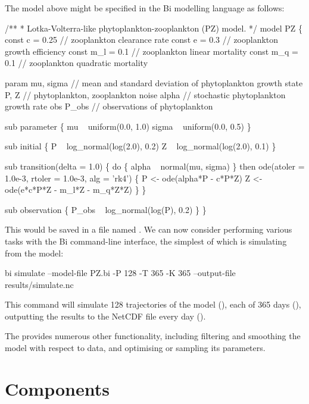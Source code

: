 The model above might be specified in the Bi modelling language as follows:
\begin{bicode}
/**
 * Lotka-Volterra-like phytoplankton-zooplankton (PZ) model.
 */
model PZ \{
  const c = 0.25   // zooplankton clearance rate
  const e = 0.3    // zooplankton growth efficiency
  const m_l = 0.1  // zooplankton linear mortality
  const m_q = 0.1  // zooplankton quadratic mortality

  param mu, sigma  // mean and standard deviation of phytoplankton growth
  state P, Z       // phytoplankton, zooplankton
  noise alpha      // stochastic phytoplankton growth rate
  obs P_obs        // observations of phytoplankton
  
  sub parameter \{
    mu ~ uniform(0.0, 1.0)
    sigma ~ uniform(0.0, 0.5)
  \}
  
  sub initial \{
    P ~ log_normal(log(2.0), 0.2)
    Z ~ log_normal(log(2.0), 0.1)
  \}

  sub transition(delta = 1.0) \{
    do \{
      alpha ~ normal(mu, sigma)
    \} then ode(atoler = 1.0e-3, rtoler = 1.0e-3, alg = 'rk4') \{
      P <- ode(alpha*P - c*P*Z)
      Z <- ode(e*c*P*Z - m_l*Z - m_q*Z*Z)
    \}
  \}

  sub observation \{
    P_obs ~ log_normal(log(P), 0.2)
  \}
\}
\end{bicode}

This would be saved in a file named . We can now consider
performing various tasks with the Bi command-line interface, the simplest of
which is simulating from the model:
\begin{cmdcode}
bi simulate --model-file PZ.bi -P 128 -T 365 -K 365 --output-file results/simulate.nc
\end{cmdcode}
This command will simulate 128 trajectories of the model (), each
of 365 days (), outputting the results to the NetCDF
file  every day ().

The  provides numerous
other functionality, including filtering and smoothing the model with respect
to data, and optimising or sampling its parameters.

\section{Components\label{Components}}

